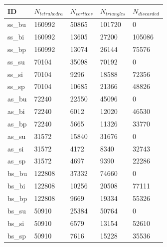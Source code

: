 \documentclass[]{article}
\begin{document}
\begin{table}[htb]
\centering
\begin{tabular}{|l|l|l|l|l|}
\hline
ID     & $N_{tetrahedra}$ & $N_{vertices}$ & $N_{triangles}$ & $N_{discarded}$ \\ \hline
ss\_bu & 160992         & 50865        & 101720        & 0             \\ \hline
ss\_bi & 160992         & 13605        & 27200         & 105086        \\ \hline
ss\_bp & 160992         & 13074        & 26144         & 75576         \\ \hline
ss\_su & 70104          & 35098        & 70192         & 0             \\ \hline
ss\_si & 70104          & 9296         & 18588         & 72356         \\ \hline
ss\_sp & 70104          & 10685        & 21366         & 48826         \\ \hline
as\_bu & 72240          & 22550        & 45096         & 0             \\ \hline
as\_bi & 72240          & 6012         & 12020         & 46530         \\ \hline
as\_bp & 72240          & 5665         & 11326         & 33770         \\ \hline
as\_su & 31572          & 15840        & 31676         & 0             \\ \hline
as\_si & 31572          & 4172         & 8340          & 32743         \\ \hline
as\_sp & 31572          & 4697         & 9390          & 22286         \\ \hline
bs\_bu & 122808         & 37332        & 74660         & 0             \\ \hline
bs\_bi & 122808         & 10256        & 20508         & 77111         \\ \hline
bs\_bp & 122808         & 9669         & 19334         & 55326         \\ \hline
bs\_su & 50910          & 25384        & 50764         & 0             \\ \hline
bs\_si & 50910          & 6579         & 13154         & 52610         \\ \hline
bs\_sp & 50910          & 7616         & 15228         & 35536         \\ \hline
\end{tabular}
\end{table}
\end{document}
